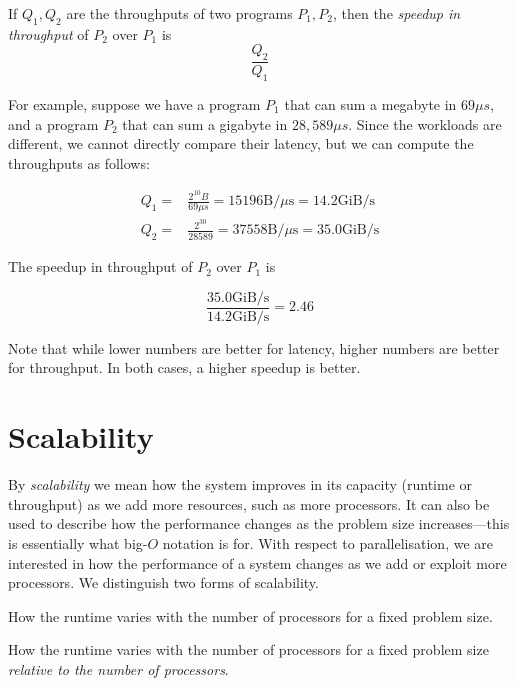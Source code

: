\begin{definition}\label{speedup-throughput}

  If $Q_{1}, Q_{2}$ are the throughputs of two programs
  $P_{1}, P_{2}$, then the \emph{speedup in throughput} of $P_{2}$
  over $P_{1}$ is
  \[
    \frac{Q_{2}}{Q_{1}}
  \]
\end{definition}

For example, suppose we have a program $P_{1}$ that can sum a megabyte
in $69\mu{}s$, and a program $P_{2}$ that can sum a gigabyte in
$28,589\mu{}s$.  Since the workloads are different, we cannot directly
compare their latency, but we can compute the throughputs as follows:

\begin{align*}
  Q_{1} =& \frac{2^{10}B}{69\mu{}s} = 15196 \textrm{B}/\mu{}\textrm{s} = 14.2 \textrm{GiB}/\textrm{s} \\
  Q_{2} =& \frac{2^{30}}{28589} = 37558 \textrm{B}/\mu{}\textrm{s} = 35.0 \textrm{GiB}/\textrm{s}
\end{align*}

The speedup in throughput of $P_{2}$ over $P_{1}$ is

\[
  \frac{35.0 \textrm{GiB}/\textrm{s}}{14.2 \textrm{GiB}/\textrm{s}} = 2.46
\]

Note that while lower numbers are better for latency, higher numbers
are better for throughput.  In both cases, a higher speedup is better.

\section{Scalability}

By \emph{scalability} we mean how the system improves in its capacity
(runtime or throughput) as we add more resources, such as more
processors.  It can also be used to describe how the performance
changes as the problem size increases---this is essentially what
big-$O$ notation is for.  With respect to parallelisation, we are
interested in how the performance of a system changes as we add or
exploit more processors.  We distinguish two forms of scalability.

\begin{definition}
  How the runtime varies with the number of processors for a fixed
  problem size.
\end{definition}

\begin{definition}
  How the runtime varies with the number of processors for a fixed
  problem size \textit{relative to the number of processors}.
\end{definition}

